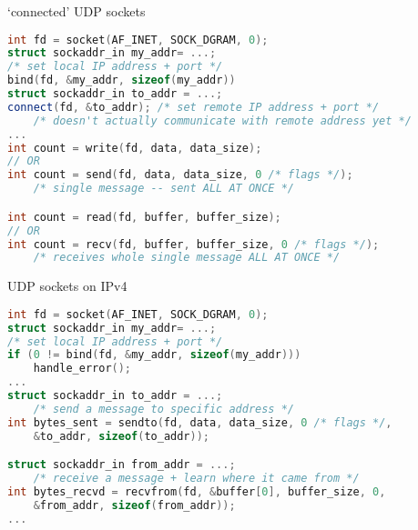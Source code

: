 
\begin{frame}[fragile]{`connected' UDP sockets}
\begin{lstlisting}[language=C++,style=smaller]
int fd = socket(AF_INET, SOCK_DGRAM, 0);
struct sockaddr_in my_addr= ...;
/* set local IP address + port */
bind(fd, &my_addr, sizeof(my_addr))
struct sockaddr_in to_addr = ...;
connect(fd, &to_addr); /* set remote IP address + port */
    /* doesn't actually communicate with remote address yet */
...
int count = write(fd, data, data_size);
// OR
int count = send(fd, data, data_size, 0 /* flags */);
    /* single message -- sent ALL AT ONCE */

int count = read(fd, buffer, buffer_size);
// OR
int count = recv(fd, buffer, buffer_size, 0 /* flags */);
    /* receives whole single message ALL AT ONCE */
\end{lstlisting}
\end{frame}

\begin{frame}[fragile]{UDP sockets on IPv4}
\begin{lstlisting}[language=C++,style=smaller]
int fd = socket(AF_INET, SOCK_DGRAM, 0);
struct sockaddr_in my_addr= ...;
/* set local IP address + port */
if (0 != bind(fd, &my_addr, sizeof(my_addr)))
    handle_error();
...
struct sockaddr_in to_addr = ...;
    /* send a message to specific address */
int bytes_sent = sendto(fd, data, data_size, 0 /* flags */,
    &to_addr, sizeof(to_addr));

struct sockaddr_in from_addr = ...;
    /* receive a message + learn where it came from */
int bytes_recvd = recvfrom(fd, &buffer[0], buffer_size, 0,
    &from_addr, sizeof(from_addr));
...
\end{lstlisting}
\end{frame}
